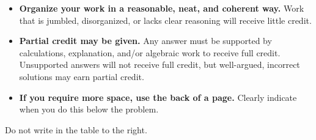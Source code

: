 \documentclass[11pt]{exam}
\begin{document}
\begin{minipage}[t]{3.7in}
\vspace{0pt}
\begin{itemize}

\item \textbf{Organize your work in a reasonable, neat, and coherent way.} Work that is jumbled, disorganized, or lacks clear reasoning will receive little credit.  

\item \textbf{Partial credit may be given.} Any answer must be supported by calculations, explanation, and/or algebraic work to receive full credit.  Unsupported answers will not receive full credit, but well-argued, incorrect solutions may earn partial credit.

\item \textbf{If you require more space, use the back of a page.} Clearly indicate when you do this below the problem.
\end{itemize}

Do not write in the table to the right.
\end{minipage}
\hfill
\begin{minipage}[t]{2.3in}
\vspace{0pt}
\addpoints
\gradetable[v][pages]
\end{minipage}
\newpage
\end{document}
